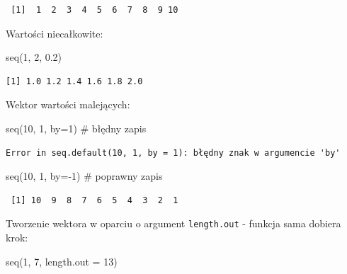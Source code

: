 \documentclass[
  letterpaper,
  DIV=11,
  numbers=noendperiod]{scrreprt}
\newenvironment{Shaded}{\begin{snugshade}}{\end{snugshade}}
\newcommand{\AttributeTok}[1]{\textcolor[rgb]{0.40,0.45,0.13}{#1}}
\newcommand{\CommentTok}[1]{\textcolor[rgb]{0.37,0.37,0.37}{#1}}
\newcommand{\DecValTok}[1]{\textcolor[rgb]{0.68,0.00,0.00}{#1}}
\newcommand{\FloatTok}[1]{\textcolor[rgb]{0.68,0.00,0.00}{#1}}
\newcommand{\FunctionTok}[1]{\textcolor[rgb]{0.28,0.35,0.67}{#1}}
\newcommand{\NormalTok}[1]{\textcolor[rgb]{0.00,0.23,0.31}{#1}}
\newcommand{\SpecialCharTok}[1]{\textcolor[rgb]{0.37,0.37,0.37}{#1}}
\begin{document}
\begin{verbatim}
 [1]  1  2  3  4  5  6  7  8  9 10
\end{verbatim}

Wartości niecałkowite:

\begin{Shaded}
\begin{Highlighting}[]
\FunctionTok{seq}\NormalTok{(}\DecValTok{1}\NormalTok{, }\DecValTok{2}\NormalTok{, }\FloatTok{0.2}\NormalTok{)}
\end{Highlighting}
\end{Shaded}

\begin{verbatim}
[1] 1.0 1.2 1.4 1.6 1.8 2.0
\end{verbatim}

Wektor wartości malejących:

\begin{Shaded}
\begin{Highlighting}[]
\FunctionTok{seq}\NormalTok{(}\DecValTok{10}\NormalTok{, }\DecValTok{1}\NormalTok{, }\AttributeTok{by=}\DecValTok{1}\NormalTok{) }\CommentTok{\# błędny zapis}
\end{Highlighting}
\end{Shaded}

\begin{verbatim}
Error in seq.default(10, 1, by = 1): błędny znak w argumencie 'by'
\end{verbatim}

\begin{Shaded}
\begin{Highlighting}[]
\FunctionTok{seq}\NormalTok{(}\DecValTok{10}\NormalTok{, }\DecValTok{1}\NormalTok{, }\AttributeTok{by=}\SpecialCharTok{{-}}\DecValTok{1}\NormalTok{) }\CommentTok{\# poprawny zapis}
\end{Highlighting}
\end{Shaded}

\begin{verbatim}
 [1] 10  9  8  7  6  5  4  3  2  1
\end{verbatim}

Tworzenie wektora w oparciu o argument \texttt{length.out} - funkcja
sama dobiera krok:

\begin{Shaded}
\begin{Highlighting}[]
\FunctionTok{seq}\NormalTok{(}\DecValTok{1}\NormalTok{, }\DecValTok{7}\NormalTok{, }\AttributeTok{length.out =} \DecValTok{13}\NormalTok{)}
\end{Highlighting}
\end{Shaded}
\end{document}
